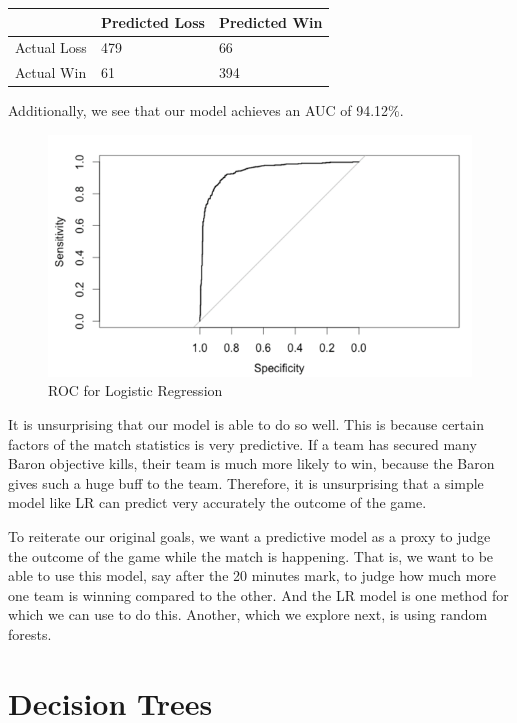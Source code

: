 \documentclass[runningheads]{llncs}
\begin{document}
	\begin{center}
		\begin{tabular}{ | L{3cm} | C{2cm} | C{2cm} | }
			\hline
			& Predicted Loss & Predicted Win \\ \hline
			Actual Loss & 479 & 66 \\ \hline
			Actual Win & 61 & 394 \\ \hline
		\end{tabular}
	\end{center}
	
	Additionally, we see that our model achieves an AUC of 94.12\%.
	
	\begin{figure}[!htb]
		\centering
		\includegraphics[width=\textwidth]{images/lr_roc.png}
		\caption{ROC for Logistic Regression}
	\end{figure}
	
	It is unsurprising that our model is able to do so well. This is because certain factors of the match statistics is very predictive. If a team has secured many Baron objective kills, their team is much more likely to win, because the Baron gives such a huge buff to the team. Therefore, it is unsurprising that a simple model like LR can predict very accurately the outcome of the game. 

	To reiterate our original goals, we want a predictive model as a proxy to judge the outcome of the game while the match is happening. That is, we want to be able to use this model, say after the 20 minutes mark, to judge how much more one team is winning compared to the other. And the LR model is one method for which we can use to do this. Another, which we explore next, is using random forests.
	
	\section{Decision Trees}
	
\end{document}
